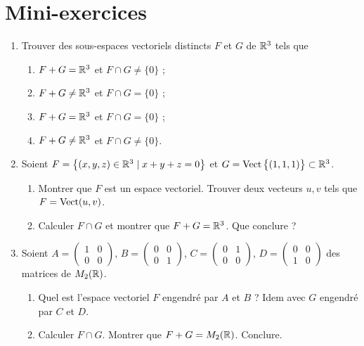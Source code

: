\section{Mini-exercices}

\begin{frame}

\begin{miniexercice}
\begin{enumerate}
  \item Trouver des sous-espaces vectoriels distincts $F$ et $G$ de $\mathbb{R}^3$
  tels que
  \begin{enumerate}
    \item $F+G = \mathbb{R}^3$ et $F\cap G \neq \{0\}$ ; 
    \item $F+G \neq \mathbb{R}^3$ et $F\cap G = \{0\}$ ;
    \item $F+G = \mathbb{R}^3$ et $F\cap G = \{0\}$ ;
    \item $F+G \neq \mathbb{R}^3$ et $F\cap G \neq \{0\}$.
  \end{enumerate}

  \item Soient $F = \big\{ (x,y,z) \in \mathbb{R}^3 \mid x+y+z = 0\big\}$ et 
  $G = \mathop{\text{Vect}}\nolimits \big\{ (1,1,1) \big\} \subset \mathbb{R}^3$.
  \begin{enumerate}
    \item Montrer que $F$ est un espace vectoriel. Trouver deux vecteurs $u,v$ 
    tels que $F = \mathop{\text{Vect}}\nolimits(u,v)$.
    \item Calculer $F \cap G$ et montrer que $F+G = \mathbb{R}^3$. Que conclure ? 
  \end{enumerate}
  

  \item Soient $A=\left(\begin{smallmatrix}1 & 0 \\ 0 & 0 \end{smallmatrix}\right)$,
  $B=\left(\begin{smallmatrix}0 & 0 \\ 0 & 1\end{smallmatrix}\right)$,
  $C=\left(\begin{smallmatrix}0 & 1 \\ 0 & 0\end{smallmatrix}\right)$,
  $D=\left(\begin{smallmatrix}0 & 0 \\ 1 & 0\end{smallmatrix}\right)$ des matrices de $M_2(\mathbb{R})$.
  \begin{enumerate}
    \item Quel est l'espace vectoriel $F$ engendré par $A$ et $B$ ? Idem avec $G$ engendré par $C$ et $D$.
    \item Calculer $F\cap G$. Montrer que $F+G = M_2(\mathbb{R})$. Conclure.
  \end{enumerate}

\end{enumerate}
\end{miniexercice}

\end{frame}

